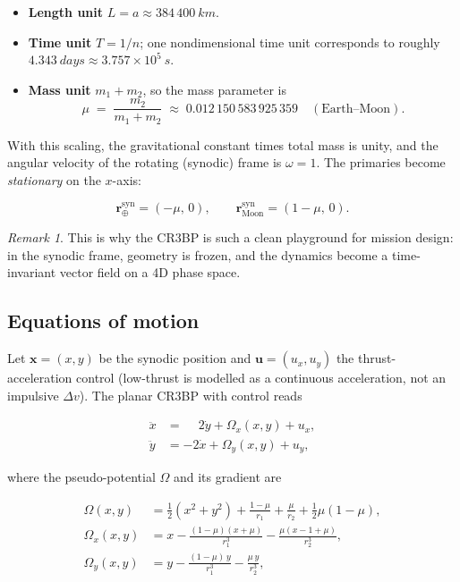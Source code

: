 \documentclass[8pt,a4paper]{article}
\newcommand{\bvec}[1]{\bm{#1}}
\newcommand{\xvec}{\bvec{x}}
\newcommand{\uvec}{\bvec{u}}
\newcommand{\Omegax}{\Omega_x}
\newcommand{\Omegay}{\Omega_y}
\theoremstyle{definition}
\theoremstyle{remark}
\newtheorem*{remark}{Remark}
\begin{document}
\begin{itemize}[leftmargin=1.5em, itemsep=1pt]
  \item \textbf{Length unit} $L = a \approx 384\,400~\si{km}$.
  \item \textbf{Time unit} $T = 1/n$; one nondimensional time unit
    corresponds to roughly $4.343~\si{days} \approx 3.757 \times 10^5~\si{s}$.
  \item \textbf{Mass unit} $m_1 + m_2$, so the mass parameter is
    \[
      \mu \;=\; \frac{m_2}{m_1 + m_2}
          \;\approx\; 0.012\,150\,583\,925\,359
          \quad (\text{Earth--Moon}).
    \]
\end{itemize}

With this scaling, the gravitational constant times total mass is
unity, and the angular velocity of the rotating (synodic) frame is
$\omega = 1$. The primaries become \emph{stationary} on the $x$-axis:

\[
  \bvec{r}_{\oplus}^{\mathrm{syn}} = (-\mu,\, 0),
  \qquad
  \bvec{r}_{\text{Moon}}^{\mathrm{syn}} = (1 - \mu,\, 0).
\]

\begin{remark}
This is why the CR3BP is such a clean playground for mission design:
in the synodic frame, geometry is frozen, and the dynamics become a
time-invariant vector field on a 4D phase space.
\end{remark}

\subsection{Equations of motion}

Let $\xvec = (x, y)$ be the synodic position and $\uvec = (u_x, u_y)$
the thrust-acceleration control (low-thrust is modelled as a
continuous acceleration, not an impulsive $\Delta v$). The planar
CR3BP with control reads

\begin{equation}
\boxed{
  \begin{aligned}
    \ddot{x} &= \phantom{-}2\dot{y} + \Omegax(x, y) + u_x, \\
    \ddot{y} &=           -2\dot{x} + \Omegay(x, y) + u_y,
  \end{aligned}
}
\label{eq:cr3bp}
\end{equation}

where the pseudo-potential $\Omega$ and its gradient are

\begin{align}
  \Omega(x, y) &= \tfrac12 (x^2 + y^2) + \frac{1-\mu}{r_1}
     + \frac{\mu}{r_2} + \tfrac12 \mu(1-\mu), \\[4pt]
  \Omegax(x,y) &= x - \frac{(1-\mu)(x+\mu)}{r_1^3}
     - \frac{\mu(x - 1 + \mu)}{r_2^3}, \\
  \Omegay(x,y) &= y - \frac{(1-\mu)\,y}{r_1^3} - \frac{\mu\,y}{r_2^3},
\end{align}
\end{document}

